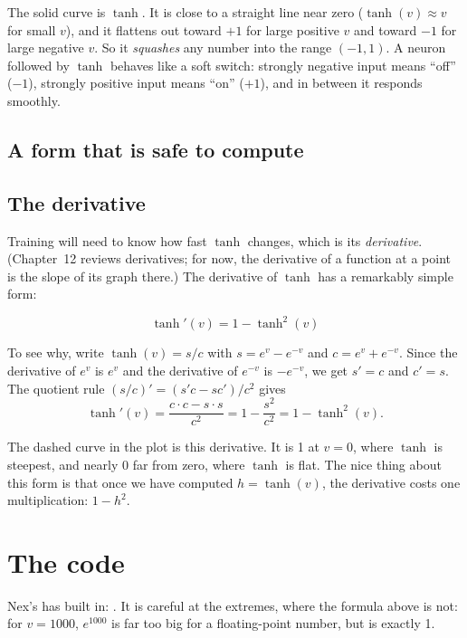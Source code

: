 \documentclass[11pt,a4paper,oneside,openany]{book}
\newcommand{\code}[1]{\texttt{\detokenize{#1}}}
\begin{document}
The solid curve is $\tanh$. It is close to a straight line near zero
($\tanh(v)\approx v$ for small $v$), and it flattens out toward $+1$ for
large positive $v$ and toward $-1$ for large negative $v$. So it
\emph{squashes} any number into the range $(-1, 1)$. A neuron followed by
$\tanh$ behaves like a soft switch: strongly negative input means
``off'' ($-1$), strongly positive input means ``on'' ($+1$), and in between
it responds smoothly.

\subsection{A form that is safe to compute}

\subsection{The derivative}

Training will need to know how fast $\tanh$ changes, which is its
\emph{derivative}. (Chapter~12 reviews derivatives; for now, the
derivative of a function at a point is the slope of its graph there.) The
derivative of $\tanh$ has a remarkably simple form:

\begin{mathbox}
\[
  \tanh'(v) = 1 - \tanh^2(v)
\]
\end{mathbox}

To see why, write $\tanh(v) = s/c$ with $s = e^{v} - e^{-v}$ and
$c = e^{v} + e^{-v}$. Since the derivative of $e^{v}$ is $e^{v}$ and the
derivative of $e^{-v}$ is $-e^{-v}$, we get $s' = c$ and $c' = s$. The
quotient rule $(s/c)' = (s'c - sc')/c^2$ gives
\[
  \tanh'(v) = \frac{c\cdot c - s\cdot s}{c^2} = 1 - \frac{s^2}{c^2} = 1 - \tanh^2(v).
\]

The dashed curve in the plot is this derivative. It is 1 at $v = 0$, where
$\tanh$ is steepest, and nearly 0 far from zero, where $\tanh$ is flat.
The nice thing about this form is that once we have computed
$h = \tanh(v)$, the derivative costs one multiplication: $1 - h^2$.

\section{The code}

Nex's \code{Real} has \code{tanh} built in: \code{v.tanh}. It is careful
at the extremes, where the formula above is not: for $v = 1000$, $e^{1000}$
is far too big for a floating-point number, but \code{1000.0.tanh} is
exactly 1.
\end{document}
